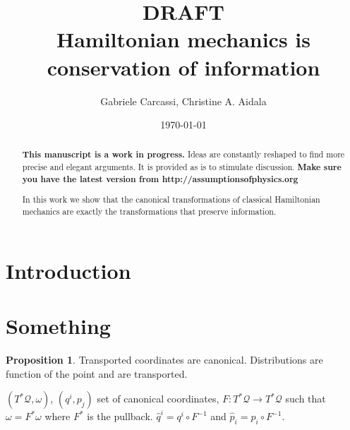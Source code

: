 \documentclass[smallextended]{svjour3}
\numberwithin{equation}{section}
\theoremstyle{definition}
\newtheorem{prop}[equation]{Proposition}
\newcommand{\journal}[1]{\ifjournal#1\fi}
\newcommand{\arxiv}[1]{\ifjournal\else#1\fi}
\begin{document}
\title{DRAFT \\ Hamiltonian mechanics is conservation of information}
\author{Gabriele Carcassi, Christine A. Aidala}

\ifjournal
\else
\fi


\date{\today}

\journal{\maketitle}
	
\begin{abstract}
\textbf{This manuscript is a work in progress.} Ideas are constantly reshaped to find more precise and elegant arguments. It is provided as is to stimulate discussion.  \textbf{Make sure you have the latest version from http://assumptionsofphysics.org}

In this work we show that the canonical transformations of classical Hamiltonian mechanics are exactly the transformations that preserve information.
\end{abstract}

\arxiv{\maketitle}

\section{Introduction}

\section{Something}

\begin{prop}
	Transported coordinates are canonical. Distributions are function of the point and are transported.
\end{prop}

$(T^*\mathcal{Q}, \omega)$, $(q^i, p_j)$ set of canonical coordinates, $F: T^*\mathcal{Q} \rightarrow T^*\mathcal{Q}$ such that $\omega = F^* \omega$ where $F^*$ is the pullback. $\hat{q}^i = q^i \circ F^{-1}$ and $\hat{p}_i = p_i \circ F^{-1}$.
\end{document}
